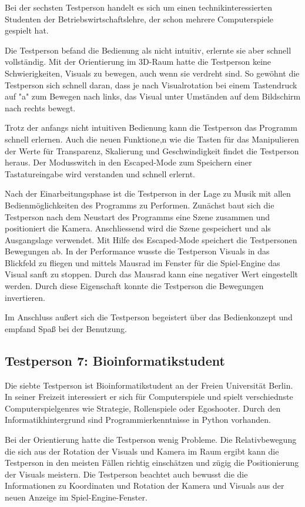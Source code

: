 Bei der sechsten Testperson handelt es sich um einen technikinteressierten Studenten der Betriebswirtschaftslehre, der schon mehrere
Computerspiele gespielt hat.

Die Testperson befand die Bedienung als nicht intuitiv, erlernte sie aber schnell vollst\"andig. Mit der Orientierung im 3D-Raum hatte die Testperson
keine Schwierigkeiten, Visuals zu bewegen, auch wenn sie verdreht sind. So gew\"ohnt die Testperson sich schnell daran, dass je nach Visualrotation
bei einem Tastendruck auf "a" zum Bewegen nach links, das Visual unter Umst\"anden auf dem Bildschirm nach rechts bewegt.

Trotz der anfangs nicht intuitiven Bedienung kann die Testperson das Programm schnell erlernen. Auch die neuen Funktione,n wie die Tasten f\"ur das
Manipulieren der Werte f\"ur Transparenz, Skalierung und Geschwindigkeit findet die Testperson heraus. Der Modusswitch in den Escaped-Mode
zum Speichern einer Tastatureingabe wird verstanden und schnell erlernt.

Nach der Einarbeitungsphase ist die Testperson in der Lage zu Musik mit allen Bedienm\"oglichkeiten des Programms zu Performen. Zun\"achst baut sich die
Testperson nach dem Neustart des Programms eine Szene zusammen und positioniert die Kamera. Anschliessend wird die Szene gespeichert und als Ausgangslage
verwendet. Mit Hilfe des Escaped-Mode speichert die Testpersonen Bewegungen ab.
In der Performance wusste die Testperson Visuals in das Blickfeld zu fliegen und mittels Mausrad im Fenster f\"ur die Spiel-Engine das Visual
sanft zu stoppen. Durch das Mausrad kann eine negativer Wert eingestellt werden. Durch diese Eigenschaft konnte die Testperson die Bewegungen invertieren.

Im Anschluss au\ss{}ert sich die Testperson begeistert \"uber das Bedienkonzept und empfand Spa\ss{} bei der Benutzung.

\subsection{Testperson 7: Bioinformatikstudent}

Die siebte Testperson ist Bioinformatikstudent an der Freien Universit\"at Berlin. In seiner Freizeit interessiert er sich f\"ur Computerspiele und
spielt verschiednste Computerspielgenres wie Strategie, Rollenspiele oder Egoshooter. Durch den Informatikhintergrund sind Programmierkenntnisse in
Python vorhanden.

Bei der Orientierung hatte die Testperson wenig Probleme. Die Relativbewegung die sich aus der Rotation der Visuals und Kamera im Raum ergibt kann die
Testperson in den meisten F\"allen richtig einsch\"atzen und z\"ugig die Positionierung der Visuals meistern. Die Testperson beachtet auch bewusst die
die Informationen zu Koordinaten und Rotation der Kamera und Visuals aus der neuen Anzeige im Spiel-Engine-Fenster.


